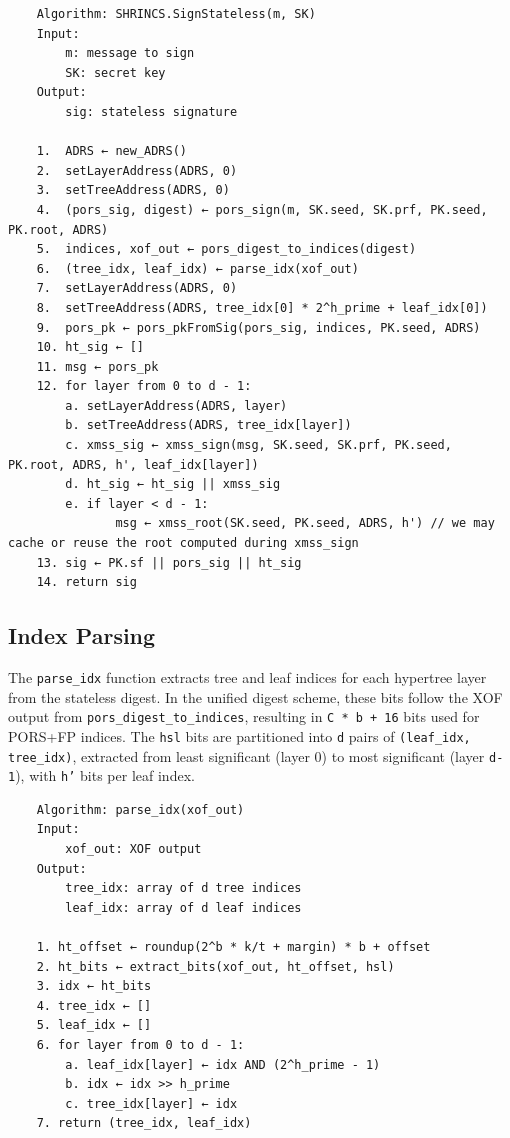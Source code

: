 \begin{verbatim}
    Algorithm: SHRINCS.SignStateless(m, SK)
    Input:
        m: message to sign
        SK: secret key
    Output:
        sig: stateless signature

    1.  ADRS ← new_ADRS()
    2.  setLayerAddress(ADRS, 0)
    3.  setTreeAddress(ADRS, 0)
    4.  (pors_sig, digest) ← pors_sign(m, SK.seed, SK.prf, PK.seed, PK.root, ADRS)
    5.  indices, xof_out ← pors_digest_to_indices(digest)
    6.  (tree_idx, leaf_idx) ← parse_idx(xof_out)
    7.  setLayerAddress(ADRS, 0)
    8.  setTreeAddress(ADRS, tree_idx[0] * 2^h_prime + leaf_idx[0])
    9.  pors_pk ← pors_pkFromSig(pors_sig, indices, PK.seed, ADRS)
    10. ht_sig ← []
    11. msg ← pors_pk
    12. for layer from 0 to d - 1:
        a. setLayerAddress(ADRS, layer)
        b. setTreeAddress(ADRS, tree_idx[layer])
        c. xmss_sig ← xmss_sign(msg, SK.seed, SK.prf, PK.seed, PK.root, ADRS, h', leaf_idx[layer])
        d. ht_sig ← ht_sig || xmss_sig
        e. if layer < d - 1:
               msg ← xmss_root(SK.seed, PK.seed, ADRS, h') // we may cache or reuse the root computed during xmss_sign 
    13. sig ← PK.sf || pors_sig || ht_sig
    14. return sig
\end{verbatim}

\subsection{Index Parsing}
The \texttt{parse\_idx} function extracts tree and leaf indices for each hypertree layer from the stateless digest. 
In the unified digest scheme, these bits follow the XOF output from \texttt{pors\_digest\_to\_indices}, resulting in \texttt{C * b + 16} bits used for PORS+FP indices. The \texttt{hsl} bits are partitioned into \texttt{d} pairs of \texttt{(leaf\_idx, tree\_idx)}, extracted from least significant (layer 0) to most significant (layer \texttt{d-1}), with \texttt{h'} bits per leaf index.
\begin{verbatim}
    Algorithm: parse_idx(xof_out)
    Input:
        xof_out: XOF output
    Output:
        tree_idx: array of d tree indices
        leaf_idx: array of d leaf indices

    1. ht_offset ← roundup(2^b * k/t + margin) * b + offset 
    2. ht_bits ← extract_bits(xof_out, ht_offset, hsl)
    3. idx ← ht_bits
    4. tree_idx ← []
    5. leaf_idx ← []
    6. for layer from 0 to d - 1:
        a. leaf_idx[layer] ← idx AND (2^h_prime - 1)
        b. idx ← idx >> h_prime
        c. tree_idx[layer] ← idx
    7. return (tree_idx, leaf_idx)
\end{verbatim}

